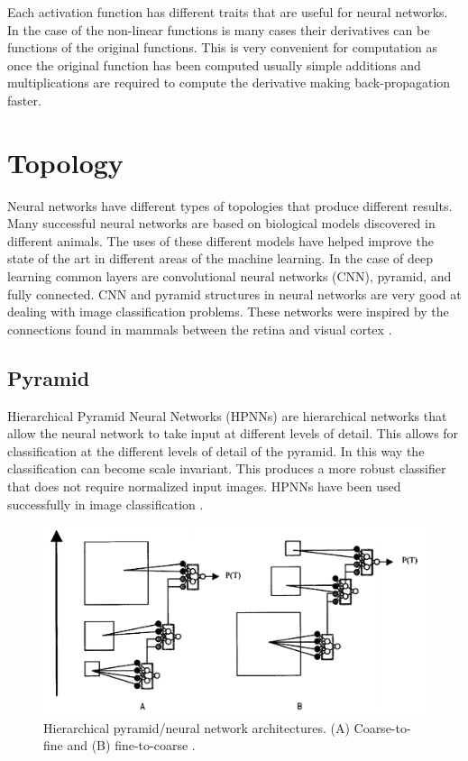 \documentclass[font=12pt]{article}
\begin{document}
Each activation function has different traits that are useful for neural networks. In the case of the non-linear functions is many cases their derivatives can be functions of the original functions. This is very convenient for computation as once the original function has been computed usually simple additions and multiplications are required to compute the derivative making back-propagation faster.

\section{Topology}
Neural networks have different types of topologies that produce different results. Many successful neural networks are based on biological models discovered in different animals. The uses of these different models have helped improve the state of the art in different areas of the machine learning. In the case of deep learning common layers are convolutional neural networks (CNN), pyramid, and fully connected. CNN and pyramid structures in neural networks are very good at dealing with image classification problems. These networks were inspired by the connections found in mammals between the retina and visual cortex \cite{6248110}.
\subsection{Pyramid}
Hierarchical Pyramid Neural Networks (HPNNs) are hierarchical networks that allow the neural network to take input at different levels of detail. This allows for classification at the different levels of detail of the pyramid. In this way the classification can become scale invariant. This produces a more robust classifier that does not require normalized input images. HPNNs have been used successfully in image classification \cite{sajda2002learning}.

\begin{figure}
\centering
\includegraphics[width=\textwidth]{HPNNarchitecture}
\caption{Hierarchical pyramid/neural network architectures. (A) Coarse-to-fine and (B) fine-to-coarse \cite{sajda2002learning}.}
\label{fig:hpnn}
\end{figure}
\end{document}
